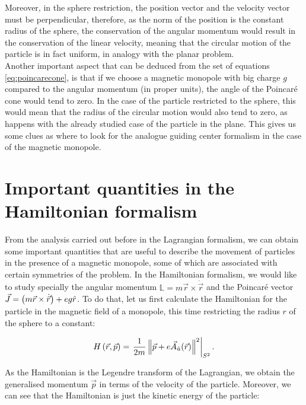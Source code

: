 Moreover, in the sphere restriction, the position vector and the velocity vector must be perpendicular, therefore, as the norm of the position is the constant radius of the sphere, the conservation of the angular momentum would result in the conservation of the linear velocity, meaning that the circular motion of the particle is in fact uniform, in analogy with the planar problem.\\

Another important aspect that can be deduced from the set of equations \eqref{eq:poincarecone}, is that if we choose a magnetic monopole with big charge $g$ compared to the angular momentum (in proper units), the angle of the Poincar\'e cone would tend to zero. In the case of the particle restricted to the sphere, this would mean that the radius of the circular motion would also tend to zero, as happens with the already studied case of the particle in the plane. This gives us some clues as where to look for the analogue guiding center formalism in the case of the magnetic monopole.\\

\section{Important quantities in the Hamiltonian formalism}
From the analysis carried out before in the Lagrangian formalism, we can obtain some important quantities that are useful to describe the movement of particles in the presence of a magnetic monopole, some of which are associated with certain symmetries of the problem. In the Hamiltonian formalism, we would like to study specially the angular momentum $\mathbb{L}= m\vec{r}\times\dot{\vec{r}}$ and the Poincar\'e vector $\vec{J} = \left( m\vec{r}\times\dot{\vec{r}} \right)+ eg\hat{r}$. To do that, let us first calculate the Hamiltonian for the particle in the magnetic field of a monopole, this time restricting the radius $r$ of the sphere to a constant:

\begin{equation}
H\left( \vec{r},\vec{p} \right) = \left.\frac{1}{2m}\left\lVert \vec{p}+e\vec{A}_{\hat{u}}(\vec{r}) \right\rVert^2\right|_{S^2}.
\label{eq:hamiltonian}
\end{equation}

As the Hamiltonian is the Legendre transform of the Lagrangian, we obtain the generalised momentum $\vec{p}$  in terms of the velocity of the particle. Moreover, we can see that the Hamiltonian is just the kinetic energy of the particle:

